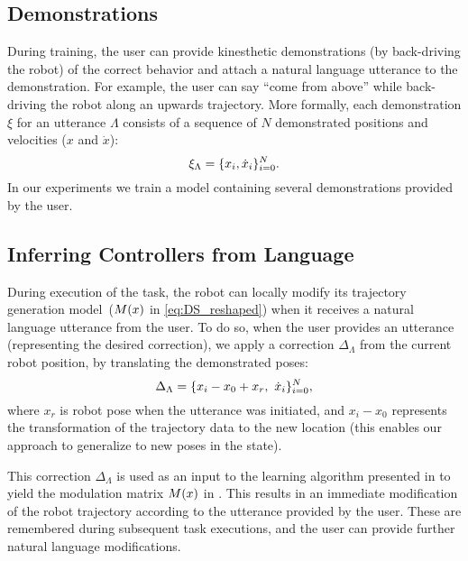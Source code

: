 \subsection{Demonstrations}

During training, the user can provide kinesthetic demonstrations (by back-driving the robot) of the correct behavior and attach a natural language utterance to the demonstration.
For example, the user can say ``come from above'' while back-driving the robot along an upwards trajectory.
More formally, each demonstration $\xi$ for an utterance $\Lambda$ consists of a sequence of $N$ demonstrated positions and velocities ($x$ and $\dot{x}$):
\begin{equation}
  \xi_\Lambda = \{ x_i, \dot{x}_i \}_{i=0}^N.
\end{equation}
In our experiments we train a model containing several demonstrations provided by the user.


\subsection{Inferring Controllers from Language}

During execution of the task, the robot can locally modify its trajectory generation model~($M\lparen x\rparen$ in \cref{eq:DS_reshaped}) when it receives a natural language utterance from the user.
To do so, when the user provides an utterance (representing the desired correction), we apply a correction $\Delta_\Lambda$ from the current robot position, by translating the demonstrated poses:
\begin{equation}
  \Delta_\Lambda = \{ x_i - x_0  + x_r, \,\, \dot{x}_i \}_{i=0}^N,
\end{equation}
where $x_r$ is robot pose when the utterance was initiated,
and $x_i-x_0$ represents the transformation of the trajectory data to the new location (this enables our approach to generalize to new poses in the state).

This correction $\Delta_\Lambda$ is used as an input to the learning algorithm presented in \citet{Kronander2015} to yield the modulation matrix $M\lparen x\rparen$ in .
This results in an immediate modification of the robot trajectory according to the utterance provided by the user.
These are remembered during subsequent task executions, and the user can provide further natural language modifications.
